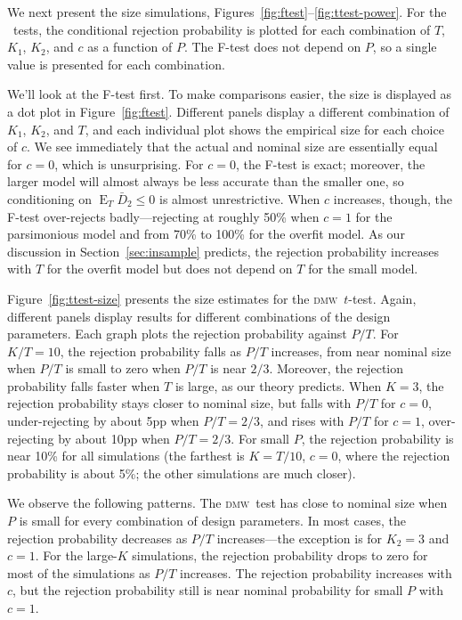 \documentclass[11pt]{article}
\DeclareMathOperator{\E}{E}
\newcommand{\dmw}{\textsc{dmw}}
\begin{document}
We next present the size simulations,
Figures~\ref{fig:ftest}--\ref{fig:ttest-power}.  For the \oos\ tests,
the conditional rejection probability is plotted for each combination
of $T$, $K_1$, $K_2$, and $c$ as a function of $P$.  The F-test does
not depend on $P$, so a single value is presented for each
combination.

We'll look at the F-test first.  To make comparisons easier, the size
is displayed as a dot plot in Figure~\ref{fig:ftest}.  Different
panels display a different combination of $K_1$, $K_2$, and $T$, and
each individual plot shows the empirical size for each choice of $c$.
We see immediately that the actual and nominal size are essentially
equal for $c = 0$, which is unsurprising.  For $c = 0$, the F-test is
exact; moreover, the larger model will almost always be less accurate
than the smaller one, so conditioning on $\E_T \bar{D}_2 \leq 0$ is
almost unrestrictive.  When $c$ increases, though, the F-test
over-rejects badly---rejecting at roughly 50\% when $c = 1$ for the
parsimonious model and from 70\% to 100\% for the overfit model.  As
our discussion in Section~\ref{sec:insample} predicts, the rejection
probability increases with $T$ for the overfit model but does not
depend on $T$ for the small model.

Figure~\ref{fig:ttest-size} presents the size estimates for the \dmw\
$t$-test.  Again, different panels display results for different
combinations of the design parameters.  Each graph plots the rejection
probability against $P/T$.  For $K/T=10$, the rejection probability
falls as $P/T$ increases, from near nominal size when $P/T$ is small
to zero when $P/T$ is near $2/3$.  Moreover, the rejection probability
falls faster when $T$ is large, as our theory predicts.  When $K=3$,
the rejection probability stays closer to nominal size, but falls with
$P/T$ for $c=0$, under-rejecting by about 5pp when $P/T = 2/3$, and
rises with $P/T$ for $c=1$, over-rejecting by about 10pp when
$P/T=2/3$.  For small $P$, the rejection probability is near 10\% for
all simulations (the farthest is $K=T/10$, $c=0$, where the rejection
probability is about 5\%; the other simulations are much closer).

We observe the following patterns.  The
\dmw\ test has close to nominal size when $P$ is small for every
combination of design parameters.  In most cases, the rejection
probability decreases as $P/T$ increases---the exception is for $K_2 =
3$ and $c=1$.  For the large-$K$ simulations, the rejection
probability drops to zero for most of the simulations as $P/T$
increases.  The rejection probability increases with $c$, but the
rejection probability still is near nominal probability for small $P$
with $c=1$.
\end{document}
